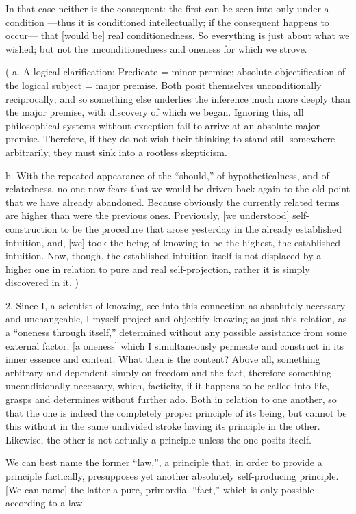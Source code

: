 In that case neither is the consequent:
the first can be seen into only under a condition
—thus it is conditioned intellectually;
if the consequent happens to occur—
that [would be] real conditionedness.
So everything is just about what we wished;
but not the unconditionedness and oneness for which we strove.

(
a. A logical clarification:
Predicate = minor premise;
absolute objectification of the logical subject = major premise.
Both posit themselves unconditionally reciprocally;
and so something else underlies the inference
much more deeply than the major premise,
with discovery of which we began.
Ignoring this, all philosophical systems without exception
fail to arrive at an absolute major premise.
Therefore, if they do not wish their thinking
to stand still somewhere arbitrarily,
they must sink into a rootless skepticism.

b. With the repeated appearance of the “should,”
of hypotheticalness, and of relatedness,
no one now fears that we would be driven back again
to the old point that we have already abandoned.
Because obviously the currently related terms are
higher than were the previous ones.
Previously, [we understood] self-construction to be
the procedure that arose yesterday
in the already established intuition,
and, [we] took the being of knowing
to be the highest, the established intuition.
Now, though, the established intuition itself is not
displaced by a higher one in relation to
pure and real self-projection,
rather it is simply discovered in it.
)

2. Since I, a scientist of knowing,
see into this connection
as absolutely necessary and unchangeable,
I myself project and objectify knowing
as just this relation,
as a “oneness through itself,”
determined without any possible assistance
from some external factor;
[a oneness] which I simultaneously permeate
and construct in its inner essence and content.
What then is the content?
Above all, something arbitrary
and dependent simply on freedom and the fact,
therefore something unconditionally necessary,
which, facticity, if it happens to be called into life,
grasps and determines without further ado.
Both in relation to one another,
so that the one is indeed the completely
proper principle of its being,
but cannot be this without
in the same undivided stroke
having its principle in the other.
Likewise, the other is not actually a principle
unless the one posits itself.

We can best name the former “law,”,
a principle that, in order to
provide a principle factically,
presupposes yet another
absolutely self-producing principle.
[We can name] the latter a pure, primordial “fact,”
which is only possible according to a law.

